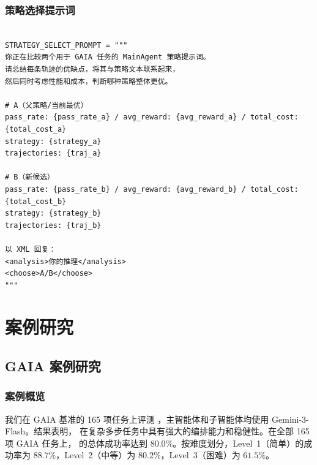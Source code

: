 \subsubsection{策略选择提示词}

\begin{tcolorbox}[title={\textbf{\small 策略选择提示词}},   boxrule=1pt, arc=0mm,colback=black!5!white,colframe=darkgray,breakable, before skip=10pt, after skip=10pt,pad at break=2mm, parbox=false]
\begin{verbatim}

STRATEGY_SELECT_PROMPT = """
你正在比较两个用于 GAIA 任务的 MainAgent 策略提示词。
请总结每条轨迹的优缺点，将其与策略文本联系起来，
然后同时考虑性能和成本，判断哪种策略整体更优。

# A（父策略/当前最优）
pass_rate: {pass_rate_a} / avg_reward: {avg_reward_a} / total_cost: {total_cost_a}
strategy: {strategy_a}
trajectories: {traj_a}

# B（新候选）
pass_rate: {pass_rate_b} / avg_reward: {avg_reward_b} / total_cost: {total_cost_b}
strategy: {strategy_b}
trajectories: {traj_b}

以 XML 回复：
<analysis>你的推理</analysis>
<choose>A/B</choose>
"""

\end{verbatim}
\end{tcolorbox}

\section{案例研究}
\label{app:case_study}

\subsection{GAIA 案例研究}

\subsubsection{案例概览}

我们在 GAIA 基准的 165 项任务上评测 \our{}，主智能体和子智能体均使用 Gemini-3-Flash。结果表明，\our{} 在复杂多步任务中具有强大的编排能力和稳健性。在全部 165 项 \textsc{GAIA} 任务上，\our{} 的总体成功率达到 $80.0\%$。按难度划分，Level~1（简单）的成功率为 $88.7\%$，Level~2（中等）为 $80.2\%$，Level~3（困难）为 $61.5\%$。

